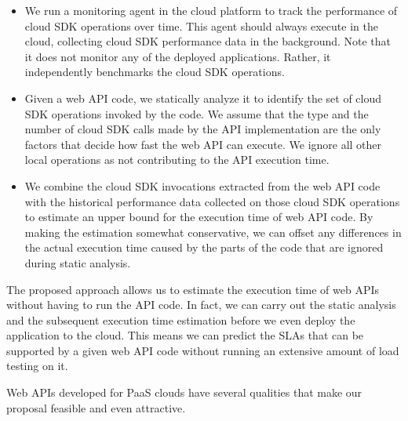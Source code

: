 \begin{itemize}
\item We run a monitoring agent in the cloud platform to track the performance of
cloud SDK operations over time. This agent should always execute in the cloud, collecting
cloud SDK performance data in the background. Note that it does not monitor any of the
deployed applications. Rather, it independently benchmarks the cloud SDK operations.
\item Given a web API code, we statically analyze it to identify the set of cloud SDK operations
invoked by the code. We assume that the type and the number of cloud SDK calls made by the API implementation
are the only factors that decide how fast the web API can execute. We ignore all other local operations
as not contributing to the API execution time.
\item We combine the cloud SDK invocations extracted from the web API code with the historical
performance data collected on those cloud SDK operations to estimate an upper bound for the
execution time of web API code. By making the estimation somewhat conservative, we can offset 
any differences in the actual execution time caused by the parts of the code that are ignored during
static analysis. 
\end{itemize}

The proposed approach allows us to estimate the execution time of web APIs without having to
run the API code.
In fact, we can carry out the static analysis and the subsequent execution time
estimation before we even deploy the application to the cloud. 
This means we can predict the SLAs that can be supported by a given web API code
without running an extensive amount of load testing on it. 

Web APIs developed for PaaS clouds have several qualities that make our proposal
feasible and even attractive.

